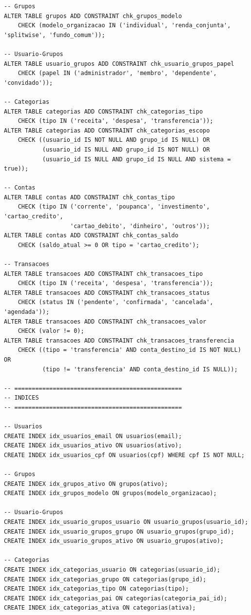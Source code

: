 \begin{lstlisting}[caption=Script completo de criacao do banco]
-- Grupos
ALTER TABLE grupos ADD CONSTRAINT chk_grupos_modelo 
    CHECK (modelo_organizacao IN ('individual', 'renda_conjunta', 'splitwise', 'fundo_comum'));

-- Usuario-Grupos
ALTER TABLE usuario_grupos ADD CONSTRAINT chk_usuario_grupos_papel 
    CHECK (papel IN ('administrador', 'membro', 'dependente', 'convidado'));

-- Categorias
ALTER TABLE categorias ADD CONSTRAINT chk_categorias_tipo 
    CHECK (tipo IN ('receita', 'despesa', 'transferencia'));
ALTER TABLE categorias ADD CONSTRAINT chk_categorias_escopo 
    CHECK ((usuario_id IS NOT NULL AND grupo_id IS NULL) OR
           (usuario_id IS NULL AND grupo_id IS NOT NULL) OR
           (usuario_id IS NULL AND grupo_id IS NULL AND sistema = true));

-- Contas
ALTER TABLE contas ADD CONSTRAINT chk_contas_tipo 
    CHECK (tipo IN ('corrente', 'poupanca', 'investimento', 'cartao_credito', 
                   'cartao_debito', 'dinheiro', 'outros'));
ALTER TABLE contas ADD CONSTRAINT chk_contas_saldo 
    CHECK (saldo_atual >= 0 OR tipo = 'cartao_credito');

-- Transacoes
ALTER TABLE transacoes ADD CONSTRAINT chk_transacoes_tipo 
    CHECK (tipo IN ('receita', 'despesa', 'transferencia'));
ALTER TABLE transacoes ADD CONSTRAINT chk_transacoes_status 
    CHECK (status IN ('pendente', 'confirmada', 'cancelada', 'agendada'));
ALTER TABLE transacoes ADD CONSTRAINT chk_transacoes_valor 
    CHECK (valor != 0);
ALTER TABLE transacoes ADD CONSTRAINT chk_transacoes_transferencia 
    CHECK ((tipo = 'transferencia' AND conta_destino_id IS NOT NULL) OR
           (tipo != 'transferencia' AND conta_destino_id IS NULL));

-- ================================================
-- INDICES
-- ================================================

-- Usuarios
CREATE INDEX idx_usuarios_email ON usuarios(email);
CREATE INDEX idx_usuarios_ativo ON usuarios(ativo);
CREATE INDEX idx_usuarios_cpf ON usuarios(cpf) WHERE cpf IS NOT NULL;

-- Grupos
CREATE INDEX idx_grupos_ativo ON grupos(ativo);
CREATE INDEX idx_grupos_modelo ON grupos(modelo_organizacao);

-- Usuario-Grupos
CREATE INDEX idx_usuario_grupos_usuario ON usuario_grupos(usuario_id);
CREATE INDEX idx_usuario_grupos_grupo ON usuario_grupos(grupo_id);
CREATE INDEX idx_usuario_grupos_ativo ON usuario_grupos(ativo);

-- Categorias
CREATE INDEX idx_categorias_usuario ON categorias(usuario_id);
CREATE INDEX idx_categorias_grupo ON categorias(grupo_id);
CREATE INDEX idx_categorias_tipo ON categorias(tipo);
CREATE INDEX idx_categorias_pai ON categorias(categoria_pai_id);
CREATE INDEX idx_categorias_ativa ON categorias(ativa);


\end{lstlisting}
